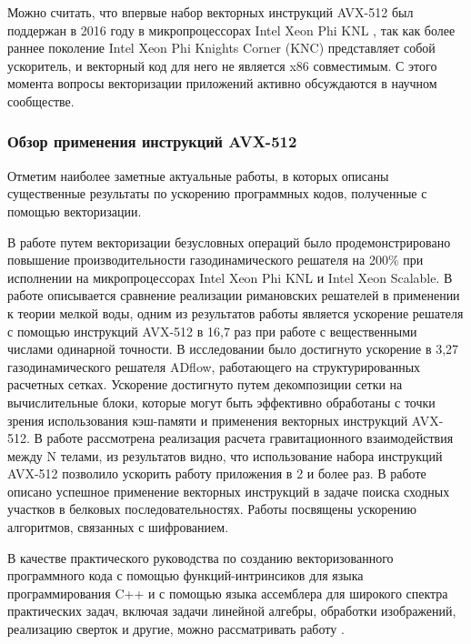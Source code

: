 Можно считать, что впервые набор векторных инструкций AVX-512 был поддержан в 2016 году в микропроцессорах Intel Xeon Phi KNL \cite{Jeffers2016KNL}, так как более раннее поколение Intel Xeon Phi Knights Corner (KNC) представляет собой ускоритель, и векторный код для него не является x86 совместимым.
С этого момента вопросы векторизации приложений активно обсуждаются в научном сообществе.

\subsubsection{Обзор применения инструкций AVX-512}

Отметим наиболее заметные актуальные работы, в которых описаны существенные результаты по ускорению программных кодов, полученные с помощью векторизации.

В работе \cite{Kulikov2019VecAstro} путем векторизации безусловных операций было продемонстрировано повышение производительности газодинамического решателя на 200\% при исполнении на микропроцессорах Intel Xeon Phi KNL и Intel Xeon Scalable.
В работе \cite{Glinting2019VecSwim} описывается сравнение реализации римановских решателей в применении к теории мелкой воды, одним из результатов работы является ускорение решателя с помощью инструкций AVX-512 в 16,7 раз при работе с вещественными числами одинарной точности.
В исследовании \cite{Yildirim2021VecCFD} было достигнуто ускорение в 3,27 газодинамического решателя ADflow, работающего на структурированных расчетных сетках.
Ускорение достигнуто путем декомпозиции сетки на вычислительные блоки, которые могут быть эффективно обработаны с точки зрения использования кэш-памяти и применения векторных инструкций AVX-512.
В работе \cite{Rucci2020VecNBody} рассмотрена реализация расчета гравитационного взаимодействия между N телами, из результатов видно, что использование набора инструкций AVX-512 позволило ускорить работу приложения в 2 и более раз.
В работе \cite{Rucci2019VecSW} описано успешное применение векторных инструкций в задаче поиска сходных участков в белковых последовательностях.
Работы \cite{Choi2023VecKorean,Cheng2021VecCSIDH} посвящены ускорению алгоритмов, связанных с шифрованием.

В качестве практического руководства по созданию векторизованного программного кода с помощью функций-интринсиков для языка программирования C++ и с помощью языка ассемблера для широкого спектра практических задач, включая задачи линейной алгебры, обработки изображений, реализацию сверток и другие, можно рассматривать работу \cite{Kusswurm2022VecCpp}.


